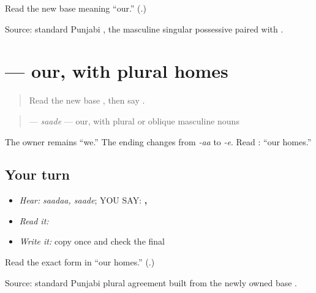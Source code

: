 \begin{tcolorbox}[breakable,colback=teal!4,colframe=teal!35!black,title={Before you move on}]
Read the new base meaning “our.” (\textbf{}.)

Source: standard Punjabi \textbf{}, the masculine singular possessive paired with \textbf{}.
\end{tcolorbox}
\section[\texorpdfstring{\pa{ਸਾਡੇ} (saade)}{ਸਾਡੇ (saade)}]{ — our, with plural homes}

\label{lesson:PA-C185-sade}



\begin{quote}
Read the new base \textbf{}, then say \textbf{}.
\end{quote}

\begin{grammarlens}[title={Grammar Lens: change only the ending}]
\begin{quote}
\textbf{} — \emph{saade} — our, with plural or oblique masculine nouns
\end{quote}

The owner remains “we.” The ending changes from \emph{-aa} to \emph{-e}. Read \textbf{ }: “our homes.”
\end{grammarlens}

\subsection*{Your turn}
\begin{itemize}
\raggedright
  \item \emph{Hear:} \emph{saadaa, saade}; YOU SAY: \textbf{, }
  \item \emph{Read it:} \textbf{ }
  \item \emph{Write it:} copy \textbf{} once and check the final \textbf{}
\end{itemize}

\begin{tcolorbox}[breakable,colback=teal!4,colframe=teal!35!black,title={Before you move on}]
Read the exact form in “our homes.” (\textbf{}.)

Source: standard Punjabi plural agreement built from the newly owned base \textbf{}.
\end{tcolorbox}
